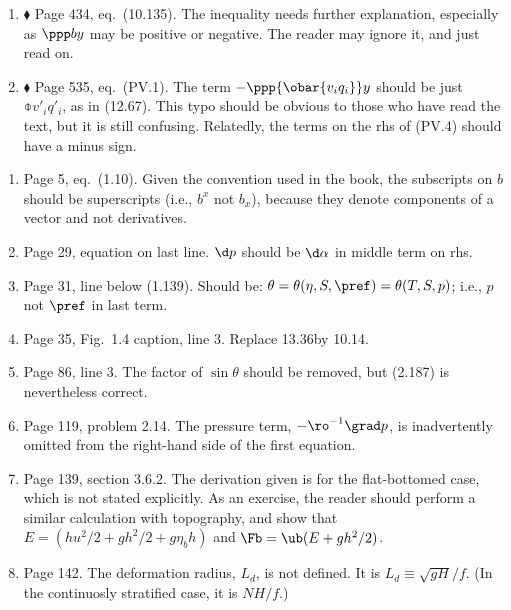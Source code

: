 \documentclass[10pt]{article}
\newcommand{\eq}{eq.\ } \newcommand{\Eq}{Eq.\ }
\renewcommand{\star}{\ensuremath{\blacklozenge} }
\begin{document}
\begin{enumerate}
\item \star Page 434, \eq (10.135). The inequality needs further explanation, especially as $\ppp by $ may be positive or negative.  The reader may ignore it, and just read on.

\item \star Page 535, \eq (PV.1). The term $-\ppp{\obar{v_i q_i}}y$ should be just $\obar{v'_i q'_i}$, as in (12.67). This typo should be obvious to those who have read the text, but it is still confusing. Relatedly, the terms on the rhs of (PV.4) should have a minus sign.

\end{enumerate}


\begin{enumerate}

\item Page 5, \eq (1.10).  Given the  convention used in the book, the subscripts on $b$ should be superscripts (i.e., $b^x$ not $b_x$), because they denote components of a vector and not derivatives.

\item Page 29, equation on last line. $\d p$ should be $\d \alpha$ in middle term on rhs.

\item Page 31, line below (1.139). Should be: $\theta = \theta(\eta, S, \pref) = \theta (T, S, p)$; i.e., $p$ not $\pref$ in last term.

\item Page 35, Fig.\ 1.4 caption, line 3. Replace 13.36\dgc by 10.14\dgc.

\item Page 86, line 3. The factor of $\sin \theta$ should be removed, but (2.187) is nevertheless correct.

\item Page 119, problem 2.14. The pressure term, $-\ro^{-1} \grad p$, is inadvertently omitted from the right-hand side of the first equation.

\item Page 139, section 3.6.2. The derivation given is for the flat-bottomed case, which is not stated explicitly. As an exercise, the reader should perform a similar calculation with topography, and show that $E = (h u^2/2 + g h^2/2 + g \eta_b h)$ and $\Fb = \ub( E + g h^2/2)$.

\item Page 142. The deformation radius, $L_d$, is not defined. It is $L_d \equiv \sqrt{gH}/f$. (In the continuosly stratified case, it is $NH/f$.)


\end{enumerate}
\end{document}
